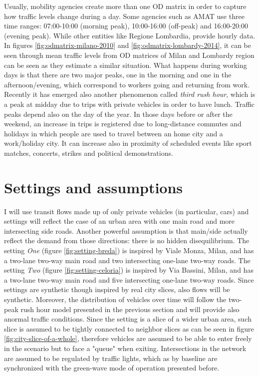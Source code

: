 Usually, mobility agencies create more than one OD matrix in order to capture how traffic levels change during a day.
Some agencies such as AMAT use three time ranges: 07:00-10:00 (morning peak), 10:00-16:00 (off-peak) and 16:00-20:00 (evening peak). 
While other entities like Regione Lombardia, provide hourly data.
In figures \ref{fig:odmatrix-milano-2010} and \ref{fig:odmatrix-lombardy-2014}, it can be seen through mean traffic levels from OD matrices of Milan and Lombardy region can be seen as they estimate a similar situation.
What happens during working days is that there are two major peaks, one in the morning and one in the afternoon/evening, which correspond to workers going and returning from work.
Recently it has emerged also another phenomenon called \textit{third rush hour}, which is a peak at midday due to trips with private vehicles in order to have lunch.
Traffic peaks depend also on the day of the year. In those days before or after the weekend, an increase in trips is registered due to long-distance commutes and holidays in which people are used to travel between an home city and a work/holiday city. It can increase also in proximity of scheduled events like sport matches, concerts, strikes and political demonstrations.


\section{Settings and assumptions}

I will use transit flows made up of only private vehicles (in particular, cars) and settings will reflect the case of an urban area with one main road and more intersecting side roads. Another powerful assumption is that main/side actually reflect the demand from those directions: there is no hidden disequilibrium.
The setting \textit{One} (figure \ref{fig:setting-breda}) is inspired by Viale Monza, Milan, and has a two-lane two-way main road and two intersecting one-lane two-way roads.
The setting \textit{Two} (figure \ref{fig:setting-celoria}) is inspired by Via Bassini, Milan, and has a two-lane two-way main road and five intersecting one-lane two-way roads.
Since settings are synthetic though inspired by real city slices, also flows will be synthetic. Moreover, the distribution of vehicles over time will follow the two-peak rush hour model presented in the previous section and will provide also anormal traffic conditions. Since the setting is a slice of a wider urban area, such slice is assumed to be tightly connected to neighbor slices as can be seen in figure \ref{fig:city-slice-of-a-whole}, therefore vehicles are assumed to be able to enter freely in the scenario but to face a "queue" when exiting. Intersections in the network are assumed to be regulated by traffic lights, which as by baseline are synchronized with the green-wave mode of operation presented before.

